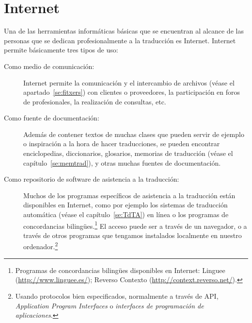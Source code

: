 \chapter{Internet} \label{se:Internet}  

Una de las herramientas informáticas básicas que se encuentran al alcance de las personas que se dedican profesionalmente a la traducción es Internet. Internet permite básicamente tres tipos de uso: \begin{description} \item[Como medio de comunicación:] Internet permite la comunicación y el intercambio de archivos (véase el apartado~\ref{se:fitxers}) con clientes o proveedores, la participación en foros de profesionales, la realización de consultas, etc. \item[Como fuente de documentación:] Además de contener textos de muchas clases que pueden servir de ejemplo o inspiración a la hora de hacer traducciones, se pueden encontrar enciclopedias, diccionarios, glosarios, memorias de traducción (véase el capítulo~\ref{se:memtrad}), y otras muchas fuentes de documentación. \item[Como repositorio de software de asistencia a la traducción:] Muchos de los programas específicos de asistencia a la traducción están disponibles en Internet, como por ejemplo los sistemas de traducción automática (véase el capítulo~\ref{se:TdTA}) en línea o los programas de concordancias bilingües.\footnote{Programas de concordancias bilingües disponibles en Internet: Linguee (\url{http://www.linguee.es/}); Reverso Contexto (\url{http://context.reverso.net/}).} El acceso puede ser a través de un navegador, o a través de otros programas que tengamos instalados localmente en nuestro ordenador.\footnote{Usando protocolos bien especificados, normalmente a través de API, \emph{Application Program Interfaces} o \emph{interfaces de programación de aplicaciones}.} \end{description} 

